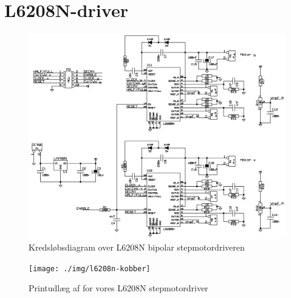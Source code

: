 \chapter{L6208N-driver}
\label{b-l6208n}

\begin{figure}[htbp]
  \centering
  \includegraphics[width=\textwidth]{./img/l6208n-driver-diagram}
  \caption{Kredsløbsdiagram over L6208N bipolar stepmotordriveren}
  \label{fig:l6208n-diagram}
\end{figure}

\begin{figure}[htbp]
  \centering
  \texttt{[image: ./img/l6208n-kobber]}
  \caption{Printudlæg af for vores L6208N stepmotordriver}
  \label{fig:l6208n-print}
\end{figure}